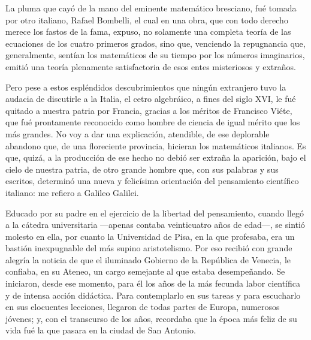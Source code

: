\documentclass[a4paper, 12pt, draft]{article}
\begin{document}
{%

La pluma que cayó de la mano del eminente matemático bresciano, fué tomada por otro italiano, Rafael Bombelli, el cual en una obra, que con todo derecho merece los fastos de la fama, expuso, no solamente una completa teoría de las ecuaciones de los cuatro primeros grados, sino que, venciendo la repugnancia que, generalmente, sentían los matemáticos de su tiempo por los números imaginarios, emitió una teoría plenamente satisfactoria de esos entes misteriosos y extraños.

Pero pese a estos espléndidos descubrimientos que ningún extranjero tuvo la audacia de discutirle a la Italia, el cetro algebráico, a fines del siglo XVI, le fué quitado a nuestra patria por Francia, gracias a los méritos de Francisco Viéte, que fué prontamente reconocido como hombre de ciencia de igual mérito que los más grandes. No voy a dar una explicación, atendible, de ese deplorable abandono que, de una floreciente provincia, hicieran los matemáticos italianos. Es que, quizá, a la producción de ese hecho no debió ser extraña la aparición, bajo el cielo de nuestra patria, de otro grande hombre que, con sus palabras y sus escritos, determinó una nueva y felicísima orientación del pensamiento científico italiano: me refiero a Galileo Galilei.








Educado por su padre en el ejercicio de la libertad del pensamiento, cuando llegó a la cátedra universitaria ---apenas contaba veinticuatro años de edad---, se sintió molesto en ella, por cuanto la Universidad de Pisa, en la que profesaba, era un bastión inexpugnable del más supino aristotelismo. Por eso recibió con grande alegría la noticia de que el iluminado Gobierno de la República de Venecia, le confiaba, en su Ateneo, un cargo semejante al que estaba desempeñando. Se iniciaron, desde ese momento, para él los años de la más fecunda labor científica y de intensa acción didáctica. Para contemplarlo en sus tareas y para escucharlo en sus elocuentes lecciones, llegaron de todas partes de Europa, numerosos jóvenes; y, con el transcurso de los años, recordaba que la época más feliz de su vida fué la que pasara en la ciudad de San Antonio.

}
\end{document}
